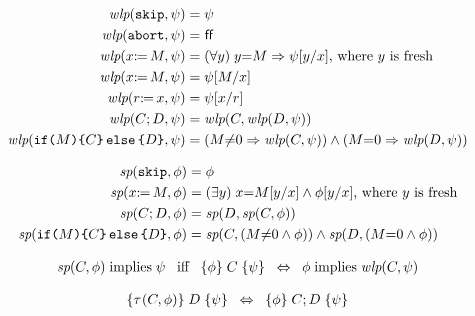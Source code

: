 \begin{align*}
  \textit{wlp}(\mathtt{skip},\psi) &= \psi
  \\
  \textit{wlp}(\mathtt{abort},\psi) &= \mkern.6mu\mathsf{ff}\mkern.6mu
  \\
  \textit{wlp}(x\mathtt{:}\mkern-1mu\mathtt{=}\, M,\psi) &= (\forall y)\; y{=}M \Rightarrow \psi[y/x] \text{, where $y$ is fresh}
  \\
  \textit{wlp}(x\mathtt{:}\mkern-1mu\mathtt{=}\, M,\psi) &= \psi[M/x] 
  \\
  \textit{wlp}(r\mathtt{:}\mkern-1mu\mathtt{=}\, x,\psi) &= \psi[x/r] 
  \\
  \textit{wlp}(C;D,\psi) &= \textit{wlp}(C,\textit{wlp}(D,\psi))
  \\
  \textit{wlp}(\mathtt{if}\allowbreak\texttt{(}M\texttt{)}\allowbreak\texttt{\{} C\texttt{\}}\,\allowbreak\mathtt{else}\allowbreak\,\texttt{\{} D\texttt{\}},\psi) &=
  (M{\neq}0\Rightarrow \textit{wlp}(C,\psi)) \land (M{=}0\Rightarrow \textit{wlp}(D,\psi))
\end{align*}

\begin{align*}
  \textit{sp}(\mathtt{skip},\phi) &= \phi
  \\
  \textit{sp}(x\mathtt{:}\mkern-1mu\mathtt{=}\, M,\phi) &= (\exists y)\;x{=}M[y/x]  \land \phi[y/x] \text{, where $y$ is fresh}
  \\
  \textit{sp}(C;D,\phi) &= \textit{sp}(D,\textit{sp}(C,\phi))
  \\
  \textit{sp}(\mathtt{if}\allowbreak\texttt{(}M\texttt{)}\allowbreak\texttt{\{} C\texttt{\}}\,\allowbreak\mathtt{else}\allowbreak\,\texttt{\{} D\texttt{\}},\phi) &=
  \textit{sp}(C, (M{\neq}0\land \phi)) \land \textit{sp}(D, (M{=}0\land \phi))
\end{align*}

\begin{align*}
  \fsp(\aCmd,\aForm) \textimplies \bForm
  \;\;\textiff\;\;
  \hoare{\aForm}{\aCmd}{\bForm} %
  \;\;\Leftrightarrow\;\;
  \aForm \textimplies \fwlp(\aCmd,\bForm)
\end{align*}

\begin{align*}
  \hoare{\aTr(\aCmd,\aForm)}{\bCmd}{\bForm} %
  \;\;\Leftrightarrow\;\;
  \hoare{\aForm}{\aCmd\SEMI\bCmd}{\bForm} %
\end{align*}
